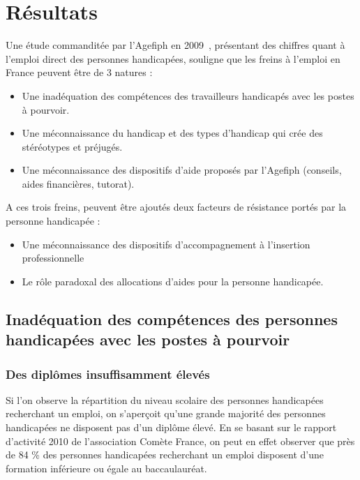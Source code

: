 \chapter{Résultats}
\label{resultats}

Une étude commanditée par l'Agefiph en 2009~\cite{etudeAgefiph1}, présentant des chiffres quant à l'emploi direct des personnes handicapées, souligne que les freins à l'emploi en France peuvent \^etre de 3 natures :
\begin{itemize}
\item Une inadéquation des compétences des travailleurs handicapés avec les postes à pourvoir.
\item Une méconnaissance du handicap et des types d'handicap qui crée des stéréotypes et préjugés.
\item Une méconnaissance des dispositifs d'aide proposés par l'Agefiph (conseils, aides financières, tutorat). \\
\end{itemize}

A ces trois freins, peuvent être ajoutés deux facteurs de résistance portés par la personne handicapée :
\begin{itemize}
\item Une méconnaissance des dispositifs d'accompagnement à l'insertion professionnelle
\item Le rôle paradoxal des allocations d'aides pour la personne handicapée.\\
\end{itemize}




\section{Inadéquation des compétences des personnes handicapées avec les postes à pourvoir}

\subsection{Des diplômes insuffisamment élevés}
Si l'on observe la répartition du niveau scolaire des personnes handicapées recherchant un emploi, on s'aperçoit qu'une grande majorité des personnes handicapées ne disposent pas d'un diplôme élevé.
En se basant sur le rapport d'activité 2010 de l'association Comète France, on peut en effet observer que près de 84 \% des personnes handicapées recherchant un emploi disposent d'une formation inférieure ou égale au baccaulauréat.

